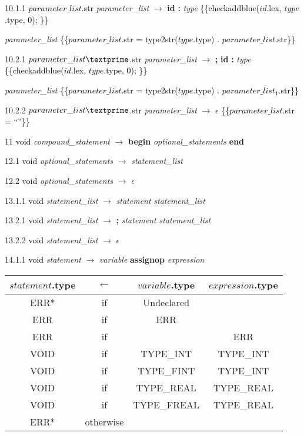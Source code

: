 10.1.1 \textcolor{black}{$parameter\_list$.str} \emph{parameter\_list} $\rightarrow$ \textbf{id} \textbf{:} \emph{type} \textcolor{black}{\{\{checkaddblue($id$.lex, $type$.type, 0); \}\}}

\emph{parameter\_list\textprime} \textcolor{black}{\{\{$parameter\_list$.str = type2str($type$.type) . $parameter\_list$\textprime.str\}\}}

10.2.1 \textcolor{black}{$parameter\_list\textprime$.str} \emph{parameter\_list\textprime} $\rightarrow$ \textbf{;} \textbf{id} \textbf{:} \emph{type} \textcolor{black}{\{\{checkaddblue($id$.lex, $type$.type, 0); \}\}}

\emph{parameter\_list\textprime} \textcolor{black}{\{\{$parameter\_list$\textprime.str = type2str($type$.type) . $parameter\_list_1$\textprime.str\}\}}


10.2.2 \textcolor{black}{$parameter\_list\textprime$.str} \emph{parameter\_list\textprime} $\rightarrow$ $\epsilon$ \textcolor{black}{\{\{$parameter\_list$\textprime.str = ``''\}\}}

11   \textcolor{black}{void} \emph{compound\_statement} $\rightarrow$ \textbf{begin} \emph{optional\_statements} \textbf{end}

12.1 \textcolor{black}{void} \emph{optional\_statements} $\rightarrow$ \emph{statement\_list}

12.2 \textcolor{black}{void} \emph{optional\_statements} $\rightarrow$ $\epsilon$

13.1.1 \textcolor{black}{void} \emph{statement\_list} $\rightarrow$ \emph{statement} \emph{statement\_list\textprime}

13.2.1 \textcolor{black}{void} \emph{statement\_list\textprime} $\rightarrow$ \textbf{;} \emph{statement} \emph{statement\_list\textprime}

13.2.2 \textcolor{black}{void} \emph{statement\_list\textprime} $\rightarrow$ $\epsilon$

14.1.1 \textcolor{black}{void} \emph{statement} $\rightarrow$ \emph{variable} \textbf{assignop} \emph{expression}

\begin{tabular}[t]{|c|c|c|c|}
  \hline

  $statement$.type & \textbf{$\leftarrow$} & $variable$.type & $expression$.type \\

  \hline

  ERR* & if & Undeclared &  \\
  ERR & if & ERR & \\
  ERR & if & & ERR \\
  VOID & if & TYPE\_INT & TYPE\_INT \\
  VOID & if & TYPE\_FINT & TYPE\_INT \\
  VOID & if & TYPE\_REAL & TYPE\_REAL \\
  VOID & if & TYPE\_FREAL & TYPE\_REAL \\
  ERR* & otherwise &  &  \\
  \hline

\end{tabular}

